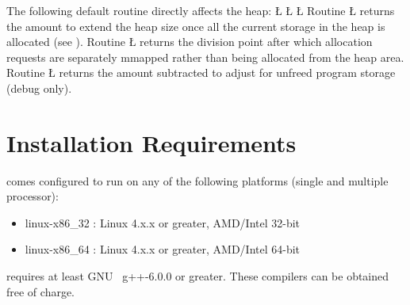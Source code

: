 \documentclass[openright,twoside]{report}
\begin{document}
The following default routine directly affects the heap:
\LGinlinefalse\LGbegin\lgrinde
\L{}
\CE{}\L{}
\CE{}\L{}
\CE{}\endlgrinde\LGend
{}%
%
%
%
%
%
Routine \LGinlinetrue\LGbegin\lgrinde\L{}\endlgrinde\LGend{} returns the amount to extend the heap size once all the current storage in the heap is allocated (see ).
Routine \LGinlinetrue\LGbegin\lgrinde\L{}\endlgrinde\LGend{} returns the division point after which allocation requests are separately mmapped rather than being allocated from the heap area.
Routine \LGinlinetrue\LGbegin\lgrinde\L{}\endlgrinde\LGend{} returns the amount subtracted to adjust for unfreed program storage (debug only).


\section{Installation Requirements}
\label{s:InstallationRequirements}

\uC comes configured to run on any of the following platforms (single and multiple processor):
\begin{itemize}[parsep=0pt,itemsep=0pt]
\item
linux-x86\_32 : Linux 4.x.x or greater, AMD/Intel 32-bit
\item
linux-x86\_64 : Linux 4.x.x or greater, AMD/Intel 64-bit
\end{itemize}
\uC requires at least GNU~\cite{GNU-C++} g++-6.0.0 or greater.
These compilers can be obtained free of charge.
\end{document}

